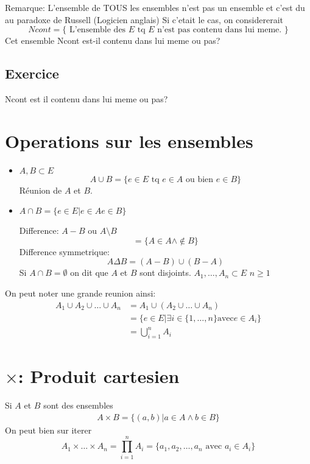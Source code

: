 \documentclass[../main.tex]{subfiles}
\begin{document}
Remarque: L'ensemble de TOUS les ensembles n'est pas un ensemble et c'est du au paradoxe de Russell (Logicien anglais)
Si c'etait le cas, on considererait
\[ 
	Ncont = \{ \text{ L'ensemble des $E$ tq $E$ n'est pas contenu dans lui meme. } \}
\]
Cet ensemble Ncont est-il contenu dans lui meme ou pas?\\
\subsection{ Exercice }
Ncont est il contenu dans lui meme ou pas? \contra

\section{Operations sur les ensembles}
\begin{itemize}
	\item $A,B \subset E$
\[ 
A \cup B = \{ e \in E \text{ tq } e \in A \text{ ou bien } e \in B \}
\]
Réunion de $A$ et $B$.
\item $A \cap B = \{ e \in E \vert e \in A  e \in B \}$

Difference: $A-B$ ou $A\setminus B$
 \[ 
	 = \{A \in A \land \not\in B \}
\]
Difference symmetrique:
\[ 
	A \Delta B = ( A -B) \cup ( B-A)
\]
Si $A \cap B = \emptyset$  on dit que $A$ et  $B$ sont disjoints.
$ A_1, \ldots, A_{n} \subset E $ $n \geq 1$ \\
\end{itemize}

On peut noter une grande reunion ainsi:
\begin{align*}
	A_1 \cup A_2 \cup \ldots \cup A_{n} &= A_1 \cup ( A_2 \cup \ldots \cup A_{n} )\\
					    &= \{ e \in E \vert \exists i \in \{1,\ldots,n\} \text{avec} e \in A_{i} \}\\
					    &= \bigcup_{i=1}^{n} A_{i} 
\end{align*}



\section{$\times$: Produit cartesien}

Si $A$ et $B$ sont des ensembles
\begin{align*}
A\times B = \{ (a,b) \vert a \in A \land b \in B\}
\end{align*}
On peut bien sur iterer
\[ 
	A_1 \times \ldots \times A_{n}  = \prod_{i=1}^{n} A_{i}  =  \{a_1,a_2,\ldots,a_{n} \text{ avec } a_i \in A_{i}\}
\]
\end{document}
